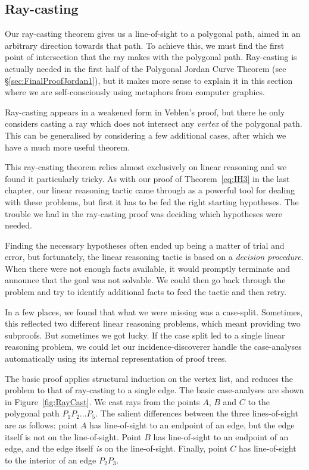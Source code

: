 \subsection{Ray-casting}\label{sec:RayCasting}
Our ray-casting theorem gives us a line-of-sight to a polygonal path, aimed in an arbitrary direction towards that path. To achieve this, we must find the first point of intersection that the ray makes with the polygonal path. Ray-casting is actually needed in the first half of the Polygonal Jordan Curve Theorem (see \S\ref{sec:FinalProofJordan1}), but it makes more sense to explain it in this section where we are  self-consciously using metaphors from computer graphics.

Ray-casting appears in a weakened form in Veblen's proof, but there he only considers casting a ray which does not intersect any \emph{vertex} of the polygonal path. This can be generalised by considering a few additional cases, after which we have a much more useful theorem.

This ray-casting theorem relies almost exclusively on linear reasoning and we found it particularly tricky. As with our proof of Theorem~\ref{eq:IH3} in the last chapter, our linear reasoning tactic came through as a powerful tool for dealing with these problems, but first it has to be fed the right starting hypotheses. The trouble we had in the ray-casting proof was deciding which hypotheses were needed. 

Finding the necessary hypotheses often ended up being a matter of trial and error, but fortunately, the linear reasoning tactic is based on a \emph{decision procedure}. When there were not enough facts available, it would promptly terminate and announce that the goal was not solvable. We could then go back through the problem and try to identify additional facts to feed the tactic and then retry. 

In a few places, we found that what we were missing was a case-split. Sometimes, this reflected two different linear reasoning problems, which meant providing two subproofs. But sometimes we got lucky. If the case split led to a single linear reasoning problem, we could let our incidence-discoverer handle the case-analyses automatically using its internal representation of proof trees.

The basic proof applies structural induction on the vertex list, and reduces the problem to that of ray-casting to a single edge. The basic case-analyses are shown in Figure~\ref{fig:RayCast}. We cast rays from the points $A$, $B$ and $C$ to the polygonal path $P_1P_2\ldots P_5$. The salient differences between the three lines-of-sight are as follows: point $A$ has line-of-sight to an endpoint of an edge, but the edge itself is not on the line-of-sight. Point $B$ has line-of-sight to an endpoint of an edge, and the edge itself \emph{is} on the line-of-sight. Finally, point $C$ has line-of-sight to the interior of an edge $P_2P_3$. 

